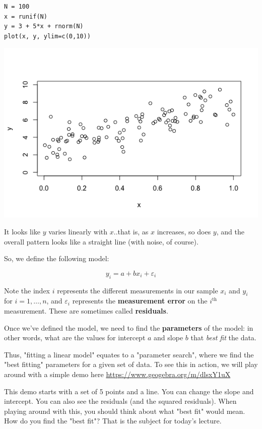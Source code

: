 \documentclass[11pt]{article}
\begin{document}
\begin{verbatim}
N = 100
x = runif(N)
y = 3 + 5*x + rnorm(N)
plot(x, y, ylim=c(0,10))
\end{verbatim}

\includegraphics[width=.9\linewidth]{figures/week7/randomLinear.png}

It looks like $y$ varies linearly with $x$..that is, as $x$ increases, so does $y$, and the overall pattern looks like a straight line (with noise, of course).

So, we define the following model:

\[
y_i = a + bx_i + \varepsilon_i
\]

Note the index $i$ represents the different measurements in our sample $x_i$ and $y_i$ for $i=1,\dots, n$, and $\varepsilon_i$ represents the \textbf{measurement error} on the $i^{\text{th}}$ measurement.  These are sometimes called \textbf{residuals}.

Once we've defined the model, we need to find the \textbf{parameters} of the model: in other words, what are the values for intercept $a$ and slope $b$ that \emph{best fit} the data.  

Thus, "fitting a linear model" equates to a "parameter search", where we find the "best fitting" parameters for a given set of data.  To see this in action, we will play around with a simple demo here \url{https://www.geogebra.org/m/dlsxY1uX}

This demo starts with a set of 5 points and a line.  You can change the slope and intercept.  You can also see the residuals (and the squared residuals).  When playing around with this, you should think about what "best fit" would mean.  How do you find the "best fit"?  That is the subject for today's lecture.
\end{document}
